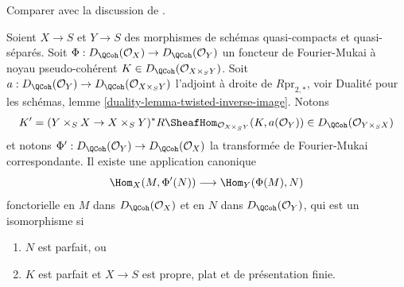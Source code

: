 \begin{lemma}
\label{lemma-fourier-mukai-right-adjoint}
\begin{reference}
Comparer avec la discussion de \cite{Rizzardo}.
\end{reference}
Soient $X \to S$ et $Y \to S$ des morphismes de schémas quasi-compacts et quasi-séparés.
Soit $\Phi : D_\QCoh(\mathcal{O}_X) \to D_\QCoh(\mathcal{O}_Y)$
un foncteur de Fourier-Mukai à noyau pseudo-cohérent
$K \in D_\QCoh(\mathcal{O}_{X \times_S Y})$.
Soit $a : D_\QCoh(\mathcal{O}_Y) \to  D_\QCoh(\mathcal{O}_{X \times_S Y})$
l'adjoint à droite de $R\text{pr}_{2, *}$, voir
Dualité pour les schémas, lemme \ref{duality-lemma-twisted-inverse-image}.
Notons
$$
K' = (Y \times_S X \to X \times_S Y)^*
R\SheafHom_{\mathcal{O}_{X \times_S Y}}(K, a(\mathcal{O}_Y)) \in
D_\QCoh(\mathcal{O}_{Y \times_S X})
$$
et notons $\Phi' : D_\QCoh(\mathcal{O}_Y) \to D_\QCoh(\mathcal{O}_X)$
la transformée de Fourier-Mukai correspondante. Il existe une application canonique
$$
\Hom_X(M, \Phi'(N)) \longrightarrow \Hom_Y(\Phi(M), N)
$$
fonctorielle en $M$ dans $D_\QCoh(\mathcal{O}_X)$ et en $N$ dans
$D_\QCoh(\mathcal{O}_Y)$, qui est un isomorphisme si
\begin{enumerate}
\item $N$ est parfait, ou
\item $K$ est parfait et $X \to S$ est propre, plat et de présentation finie.
\end{enumerate}
\end{lemma}

